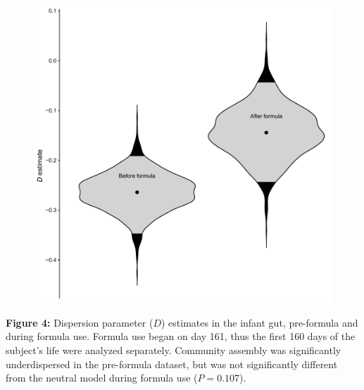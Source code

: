 \documentclass{article}
\begin{document}
{\begin{figure}[t]
	\centering
	\includegraphics[scale=0.80]{figs/Fig_4.pdf}
\end{figure}
\textbf{Figure 4:}\label{sec:figure4} Dispersion parameter (\(D\)) estimates in the infant gut, pre-formula and during formula use. Formula use began on day 161, thus the first 160 days of the subject's life were analyzed separately. Community assembly was significantly underdispersed in the pre-formula dataset, but was not significantly different from the neutral model during formula use (\(P = 0.107\)).
\newpage

}%




\newpage
\end{document}
